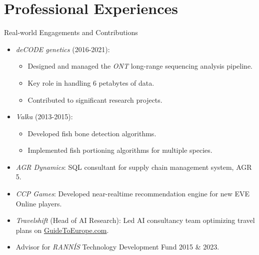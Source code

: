 \documentclass[
    NAME={Dr. Helga Ingimundardóttir},
    EMAIL={helgaingim@hi.is},
    FACULTY={Industrial Engineering},
    SUBTITLE={From Smart Algorithms in Fish Portioning to Pioneering Pipelines in Long-Range DNA Sequencing and Digital Travel},
    SEMINAR={IVT Faculty Gathering},
    DATE={September 6, 2023}
]{hi-latex/hi-beamer}
\begin{document}
\section{Professional Experiences}
\begin{frame}{Real-world Engagements and Contributions}
\begin{itemize}
    \item \emph{deCODE genetics} (2016-2021):
    \begin{itemize}
        \item Designed and managed the \emph{ONT} long-range sequencing analysis pipeline.
        \item Key role in handling 6 petabytes of data.
        \item Contributed to significant research projects.
    \end{itemize}

    \item \emph{Valka} (2013-2015):
    \begin{itemize}
        \item Developed fish bone detection algorithms.
        \item Implemented fish portioning algorithms for multiple species.
    \end{itemize}

    \item \emph{AGR Dynamics}: SQL consultant for supply chain management system, AGR 5.

    \item \emph{CCP Games}: Developed near-realtime recommendation engine for new EVE Online players.

    \item \emph{Travelshift} (Head of AI Research): Led AI consultancy team optimizing travel plans on \href{https://guidetoeurope.com/best-vacation-packages}{GuideToEurope.com}.

    \item Advisor for \emph{RANNÍS} Technology Development Fund 2015 \& 2023.
\end{itemize}
\end{frame}
\end{document}
